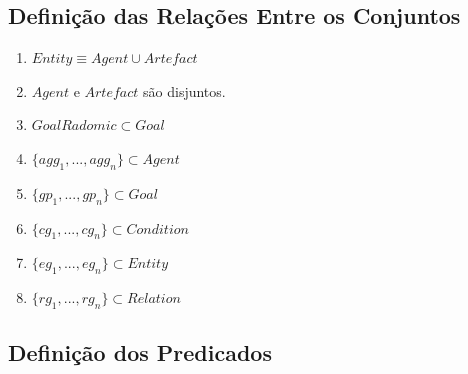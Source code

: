 \documentclass[12pt]{article}
\begin{document}
\subsection{Definição das Relações Entre os Conjuntos}

\begin{enumerate}
	\item $Entity \equiv Agent \cup Artefact$
	\item $Agent$ e $Artefact$ são disjuntos.
	\item $GoalRadomic \subset Goal$
	\item $\{agg_1,...,agg_n\} \subset Agent$	
	\item $\{gp_1,...,gp_n\} \subset Goal$
	\item $\{cg_1,...,cg_n\} \subset Condition$
	\item $\{eg_1,...,eg_n\} \subset Entity$		
	\item $\{rg_1,...,rg_n\} \subset Relation$	
\end{enumerate}

\subsection{Definição dos Predicados}
\end{document}
